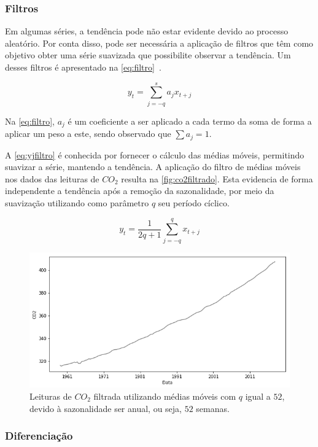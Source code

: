 \documentclass[
    12pt,
    oneside,
    a4paper,
    english,
    brazil
]{abntex2}
\begin{document}
\subsubsection{Filtros}

Em  algumas séries, a  tendência pode  não estar  evidente  devido ao  processo
aleatório. Por conta disso, pode ser  necessária a aplicação de filtros que têm
como objetivo obter  uma série suavizada que possibilite  observar a tendência.
Um desses filtros é apresentado na \autoref{eq:filtro}~\cite{ehlers}.

\begin{equation}
    \label{eq:filtro}
    y_t = \sum_{j = -q}^{s}{a_{j}x_{t+j}}
\end{equation}

Na \autoref{eq:filtro}, $a_j$  é um coeficiente a ser aplicado  a cada termo da
soma de forma a aplicar um peso a este, sendo observado que $\sum{a_j} = 1$.

A  \autoref{eq:yjfiltro}  é  conhecida  por   fornecer  o  cálculo  das  médias
móveis,  permitindo  suavizar  a  série,  mantendo  a  tendência.  A  aplicação
do  filtro  de médias  móveis  nos  dados das  leituras  de  $CO_2$ resulta  na
\autoref{fig:co2filtrado}.  Esta evidencia  de forma  independente a  tendência
após  a  remoção  da  sazonalidade,  por meio  da  suavização  utilizando  como
parâmetro $q$ seu período cíclico.

\begin{equation}
    \label{eq:yjfiltro}
    y_t = \frac{1}{2q + 1}\sum_{j=-q}^{q}{x_{t+j}}
\end{equation}

\begin{figure}[ht]
    \centering
    \caption{Leituras de $CO_2$ filtrada utilizando médias móveis com $q$ igual
        a $52$, devido à sazonalidade ser anual, ou seja, $52$
        semanas.}\label{fig:co2filtrado}
    \includegraphics[width=.5\linewidth]{images/co2_filtered.png}
\end{figure}

\subsubsection{Diferenciação}\label{sec:diff}
\end{document}

